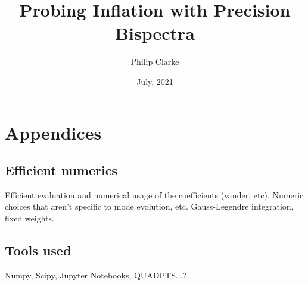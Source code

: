 \documentclass[withindex,glossary]{cam-thesis}
\title{Probing Inflation with Precision Bispectra}
\author{Philip Clarke}
\date{July, 2021}
\begin{document}
\frontmatter{}
\listoffigures
\listoftables













%

\renewcommand{\bibname}{References}
\cleardoublepage
{}
{}






\appendix

\chapter{Appendices}
\section{Efficient numerics}
Efficient evaluation and numerical usage of the coefficients (vander, etc).
Numeric choices that aren't specific to mode evolution, etc.
Gauss-Legendre integration, fixed weights.
\section{Tools used}
Numpy, Scipy, Jupyter Notebooks, QUADPTS...?
\end{document}
